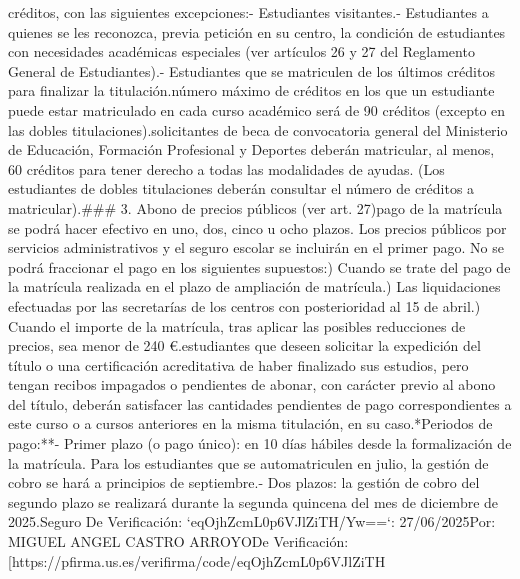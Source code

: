 \documentclass{article}
\begin{document}
\begin{itemize}
créditos, con las siguientes excepciones:\n\n- Estudiantes visitantes.\n- Estudiantes a quienes se les reconozca, previa petición en su centro, la condición de estudiantes con necesidades académicas especiales (ver artículos 26 y 27 del Reglamento General de Estudiantes).\n- Estudiantes que se matriculen de los últimos créditos para finalizar la titulación.\n\nEl número máximo de créditos en los que un estudiante puede estar matriculado en cada curso académico será de 90 créditos (excepto en las dobles titulaciones).\n\nLos solicitantes de beca de convocatoria general del Ministerio de Educación, Formación Profesional y Deportes deberán matricular, al menos, 60 créditos para tener derecho a todas las modalidades de ayudas. (Los estudiantes de dobles titulaciones deberán consultar el número de créditos a matricular).\n\n### 3. Abono de precios públicos (ver art. 27)\n\nEl pago de la matrícula se podrá hacer efectivo en uno, dos, cinco u ocho plazos. Los precios públicos por servicios administrativos y el seguro escolar se incluirán en el primer pago. No se podrá fraccionar el pago en los siguientes supuestos:\n\na) Cuando se trate del pago de la matrícula realizada en el plazo de ampliación de matrícula.\nb) Las liquidaciones efectuadas por las secretarías de los centros con posterioridad al 15 de abril.\nc) Cuando el importe de la matrícula, tras aplicar las posibles reducciones de precios, sea menor de 240 €.\n\nLos estudiantes que deseen solicitar la expedición del título o una certificación acreditativa de haber finalizado sus estudios, pero tengan recibos impagados o pendientes de abonar, con carácter previo al abono del título, deberán satisfacer las cantidades pendientes de pago correspondientes a este curso o a cursos anteriores en la misma titulación, en su caso.\n\n**Periodos de pago:**\n\n- Primer plazo (o pago único): en 10 días hábiles desde la formalización de la matrícula. Para los estudiantes que se automatriculen en julio, la gestión de cobro se hará a principios de septiembre.\n- Dos plazos: la gestión de cobro del segundo plazo se realizará durante la segunda quincena del mes de diciembre de 2025.\n{} Seguro De Verificación: `eqOjhZcmL0p6VJlZiTH/Yw==`\nFecha: 27/06/2025\nFirmado Por: MIGUEL ANGEL CASTRO ARROYO\nUrl De Verificación: [https://pfirma.us.es/verifirma/code/eqOjhZcmL0p6VJlZiTH%
\end{itemize}
\end{document}
